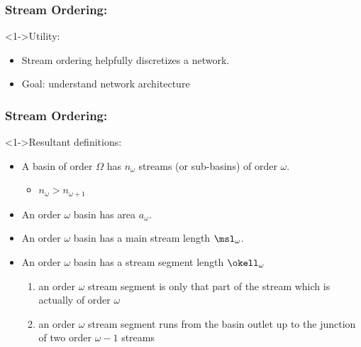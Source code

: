 \begin{frame}[label=]
  \frametitle{Stream Ordering:}

  \begin{block}<1->{Utility:}
    \begin{itemize}
    \item<2-> Stream ordering helpfully discretizes a network.
    \item<3-> Goal: understand \alert{network architecture}
    \end{itemize}
  \end{block}

\end{frame}

\begin{frame}[label=]
  \frametitle{Stream Ordering:}


  \begin{block}<1->{Resultant definitions:}
    \begin{itemize}
    \item <1->
      A basin of order $\Omega$ has 
      \alert{$n_\omega$} streams (or sub-basins) of order $\omega$.
      \begin{itemize}
      \item<2-> $n_\omega > n_{\omega+1}$
      \end{itemize}
    \item <3->
      An order $\omega$ basin has \alert{area $a_\omega$}.
    \item <4->
      An order $\omega$ basin has a \alert{main stream length $\msl_\omega$}.
    \item <5-> 
      An order $\omega$ basin has a \alert{stream segment length $\okell_\omega$}
      \begin{enumerate}
      \item<6-> an order $\omega$ stream segment is only that part of the stream which is actually of order $\omega$
      \item<7-> an order $\omega$ stream segment runs from the 
        basin outlet up to the junction of two order $\omega-1$ streams
      \end{enumerate}
    \end{itemize}
  \end{block}

\end{frame}

\begin{frame}

  \showtarotcards{0.35}{
    john-dory,
    overview,
    complex-networks,
    random-networks,
    scale-free-networks,
    small-world-networks,
    theory-six-degrees,
    landscapes-of-forking-paths,
    networks-of-blood,
    trees-of-reality,
    orders-of-streams,
    laws-of-branching,
}

\end{frame}

